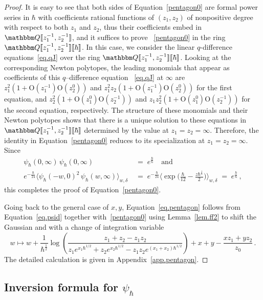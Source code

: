 \documentclass[12pt,reqno]{amsart}
\theoremstyle{definition}
\def\BQ{\mathbbm Q}
\def\be{\begin{equation}}
\def\ee{\end{equation}}
\renewcommand{\=}{\;=\;}
\newcommand{\hroot}{\hbar^{\frac{1}{2}}}
\begin{document}
\begin{proof}
It is easy to see that both sides of Equation~\eqref{pentagon0} are formal power
series in $\hbar$ with coefficients rational functions of $(z_1,z_2)$ of
nonpositive degree with respect to both $z_1$ and $z_2$, thus their coefficients
embed in $\BQ\llbracket z_1^{-1}, z_2^{-1} \rrbracket$, and it suffices to prove
~\eqref{pentagon0} in the ring $\BQ\llbracket z_1^{-1}, z_2^{-1} \rrbracket
\llbracket \hbar \rrbracket$. In this case, we consider the linear $q$-difference
equations~\eqref{eq.qJ} over the ring $\BQ\llbracket z_1^{-1}, z_2^{-1} \rrbracket
\llbracket \hbar \rrbracket$. Looking at the corresponding Newton polytopes, 
the leading monomials that appear as coefficients of this $q$--difference equation
~\eqref{eq.qJ} at $\infty$ are $z_1^{2}(1+\mathrm{O}(z_1^{-1})\mathrm{O}(z_2^{0}))$
and $z_1^{2}z_2(1+\mathrm{O}(z_1^{-1})\mathrm{O}(z_2^{0}))$ for the first equation,
and $z_2^{2}(1+\mathrm{O}(z_1^{0})\mathrm{O}(z_2^{-1}))$ and
$z_1z_2^{2}(1+\mathrm{O}(z_1^{0})\mathrm{O}(z_2^{-1}))$ for the second equation,
respectively. The structure of these monomials and their Newton polytopes
shows that there is a unique solution to these equations in
$\BQ\llbracket z_1^{-1},z_2^{-1}\rrbracket\llbracket\hbar\rrbracket$ determined
by the value at $z_1=z_2=\infty$. Therefore, the identity in
Equation~\eqref{pentagon0} reduces to its specialization at $z_1=z_2=\infty$.
Since
\be
\begin{aligned}
\psi_\hbar(0,\infty)\,\psi_\hbar(0,\infty)
&\=
e^{\frac{\hbar}{6}}\quad\text{and}\\
e^{- \frac \hbar {24}}
\big\langle\psi_\hbar(-w,0)^2
\,\psi_\hbar(w,\infty)
\big\rangle_{w,\delta}
&\=
e^{- \frac \hbar {24}}
\Big\langle\exp\Big(
\frac{\hbar}{12}-\frac{z\hbar^{\frac{1}{2}}}{2}
\Big)\Big\rangle_{w,\delta}
\=
e^{\frac{\hbar}{6}}\,,
\end{aligned}
\ee
this completes the proof of Equation~\eqref{pentagon0}.

\medskip

Going back to the general case of $x,y$, Equation~\eqref{eq.pentagon} follows
from Equation~\eqref{eq.psid} together with~\eqref{pentagon0} using
Lemma~\ref{lem.ff2} to shift the Gaussian and with a change of integration
variable
\be
w \mapsto w+\frac{1}{\hroot}\log\left(\frac{z_1+z_2-z_1z_2}{
z_1e^{x_1\hbar^{1/2}}+z_2e^{x_2\hbar^{1/2}}-z_1z_2e^{(x_1+x_2)\hbar^{1/2}}}\right)
+x+y - \frac{xz_1+yz_2}{z_0}\,.
\ee
The detailed calculation is given in Appendix~\ref{app.pentagon}.
\end{proof}

\subsection{\texorpdfstring{Inversion formula for $\psi_\hbar$}{Inversion formula for psi}}
\label{sub.inversion}
\end{document}
